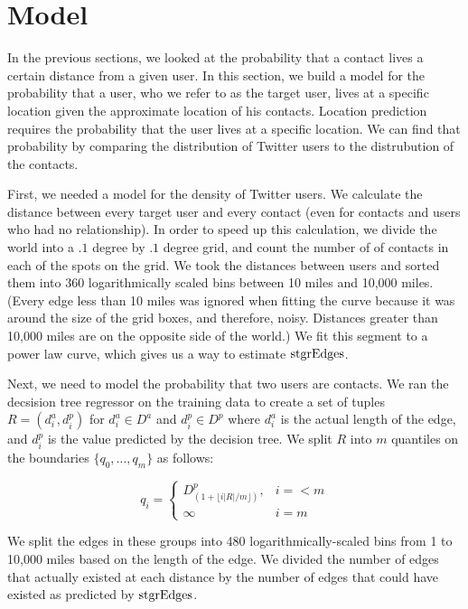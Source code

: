 \section{Model}
\label{sec:model}

In the previous sections, we looked at the probability that a contact lives a
certain distance from a given user.
%
In this section, we build a model for the probability that a user, who we refer
to as the target user, lives at a specific location given the approximate
location of his contacts.
%
Location prediction requires the probability that the user lives at a specific
location.
%
We can find that probability by comparing the distribution of Twitter users to
the distrubution of the contacts.

First, we needed a model for the density of Twitter users.
%
We calculate the distance between every target user and every contact
(even for contacts and users who had no relationship).
%
In order to speed up this calculation, we divide the world into a $.1$ degree
by $.1$ degree grid, and count the number of of contacts in each of the spots
on the grid.
%
We took the distances between users and sorted them into 360 logarithmically
scaled bins between 10 miles and 10,000 miles.
%
(Every edge less than 10 miles was ignored when fitting the curve because it
was around the size of the grid boxes, and therefore, noisy. Distances greater
than 10,000 miles are on the opposite side of the world.)
%
We fit this segment to a power law curve, which gives us a way to estimate
$\operatorname{stgrEdges}$.

Next, we need to model the probability that two users are contacts.
%
We ran the decsision tree regressor on the training data to create a set of
tuples $R = (d^a_i, d^p_i)$ for $d^a_i \in D^a$ and $d^p_i \in D^p$ where
$d^a_i$ is the actual length of the edge, and $d^p_i$ is the value predicted by
the decision
tree.
%
We split $R$ into $m$ quantiles on the boundaries $\{q_0,\dots,q_m\}$ as
follows:

\[
    q_i =
    \begin{cases}
        D^p_{(1+\lfloor i|R|/m \rfloor)}, & i=<m \\
        \infty & i=m
    \end{cases}
\]

We split the edges in these groups into 480 logarithmically-scaled bins from 1
to 10,000 miles based on the length of the edge.
%
We divided the number of edges that actually existed at each distance by the
number of edges that could have existed as predicted by $\operatorname{stgrEdges}$.

